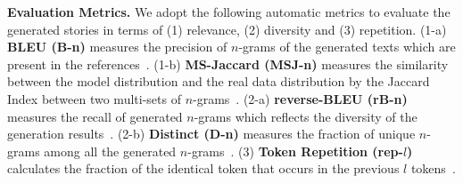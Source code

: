 \documentclass[11pt]{article}
\begin{document}
\textbf{Evaluation Metrics.}
We adopt the following automatic metrics to evaluate the generated stories in terms of (1) relevance, (2) diversity and (3) repetition. (1-a) \textbf{BLEU (B-n)} measures the precision of $n$-grams of the generated texts which are present in the references~\citep{Papineni2001BleuAM}. (1-b) \textbf{MS-Jaccard (MSJ-n)} measures the similarity between the model distribution and the real data distribution by the Jaccard Index between two multi-sets of $n$-grams~\citep{DBLP:journals/corr/abs-1904-03971}. (2-a) \textbf{reverse-BLEU (rB-n)} measures the recall of generated $n$-grams which reflects the diversity of the generation results~\citep{DBLP:conf/ijcai/ShiCQH18}. (2-b) \textbf{Distinct (D-n)} measures the fraction of unique $n$-grams among all the generated $n$-grams~\citep{DBLP:conf/naacl/LiGBGD16}. (3) \textbf{Token Repetition (rep-$l$)} calculates the fraction of the identical token that occurs in the previous $l$ tokens~\citep{DBLP:conf/iclr/WelleckKRDCW20}.
\end{document}
